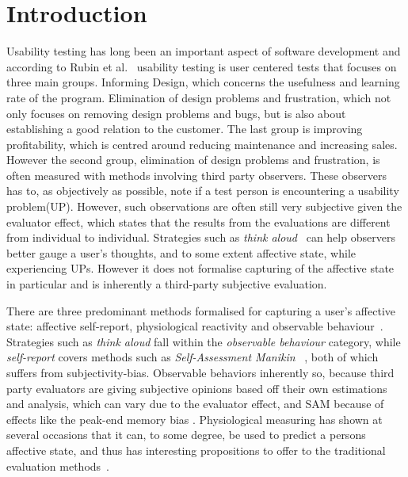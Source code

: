\section{Introduction}

Usability testing has long been an important aspect of software development and according to Rubin et al.~\cite{rubin2008handbook} usability testing is user centered tests that focuses on three main groups.
Informing Design, which concerns the usefulness and learning rate of the program.
Elimination of design problems and frustration, which not only focuses on removing design problems and bugs, but is also about establishing a good relation to the customer.
The last group is improving profitability, which is centred around reducing maintenance and increasing sales.
However the second group, elimination of design problems and frustration, is often measured with methods involving third party observers.
These observers has to, as objectively as possible, note if a test person is encountering a usability problem(UP).
However, such observations are often still very subjective given the evaluator effect\cite{eval_effect}, which states that the results from the evaluations are different from individual to individual.
Strategies such as \textit{think aloud}~\cite{use_of_TA_and_IDA} can help observers better gauge a user's
thoughts, and to some extent affective state, while experiencing UPs. However it does
not formalise capturing of the affective state in particular and is inherently a third-party
subjective evaluation. 

There are three predominant methods formalised for capturing a user's affective state: affective self-report, physiological reactivity and
observable behaviour~\cite{BRADLEY199449}. Strategies such as \textit{think
aloud} fall within the \textit{observable behaviour} category, while
\textit{self-report} covers methods such as \textit{Self-Assessment Manikin}
~\cite{BRADLEY199449}, both of which suffers from subjectivity-bias. 
Observable behaviors inherently so, because third party evaluators are giving subjective opinions based off their own estimations and analysis, which can vary due to the evaluator effect, and SAM because of effects like the peak-end memory bias \cite{cockburn_peakend}.
Physiological measuring has shown at several occasions that it can, to some degree, be used to predict a persons
affective state, and thus has interesting propositions to offer to the traditional evaluation methods~\cite{eeg_facial_expressions,fusion4,90_percent_eeg_emotion}.

